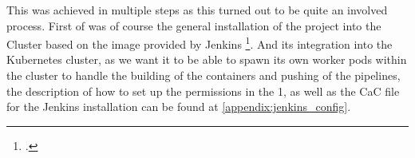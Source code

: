This was achieved in multiple steps as this turned out to be quite an involved process.
First of was of course the general installation of the project into the Cluster based on the image provided by Jenkins \footcite{JenkinsJenkinsJenkinsci}.
And its integration into the Kubernetes cluster, as we want it to be able to spawn its own worker pods within the cluster to handle the building of the containers and pushing of the pipelines, 
the description of how to set up the permissions in the 1, as well as the \ac{CaC} file for the Jenkins installation can be found at \ref{appendix:jenkins_config}.

        